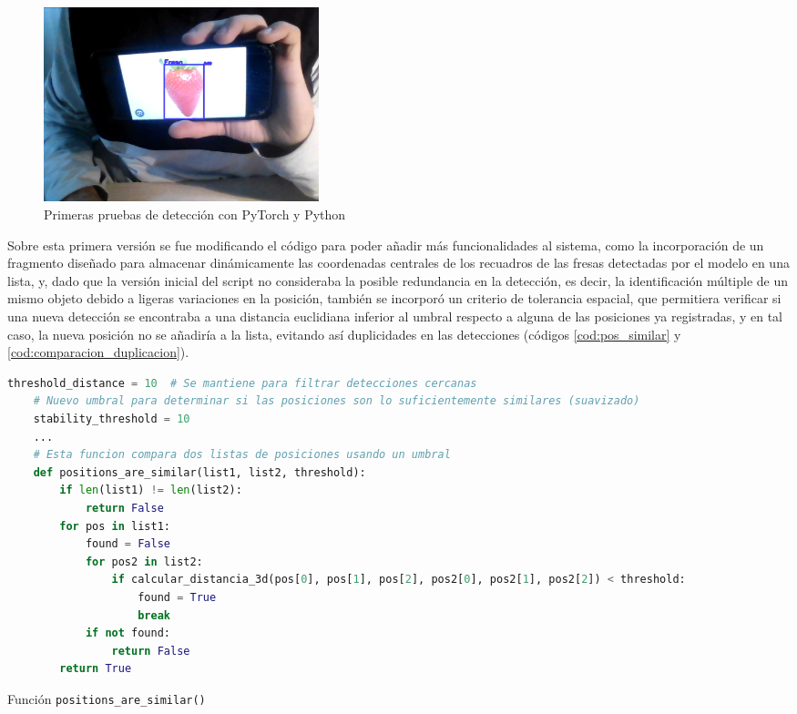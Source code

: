   \begin{figure}[H]
     \centering
     \begin{center}
       \includegraphics[width=80mm]{figs/deteccion_video fresa en foto.png}
     \end{center}
     \caption{Primeras pruebas de detección con PyTorch y Python}
    \label{fig:primerasdetecciones_Python}
  \end{figure}
  
\pagebreak
Sobre esta primera versión se fue modificando el código para poder añadir más funcionalidades al sistema, como la incorporación de un fragmento diseñado para almacenar dinámicamente las coordenadas centrales de los recuadros de las fresas detectadas por el modelo en una lista, y, dado que la versión inicial del script no consideraba la posible redundancia en la detección, es decir, la identificación múltiple de un mismo objeto debido a ligeras variaciones en la posición, también se incorporó un criterio de tolerancia espacial, que permitiera verificar si una nueva detección se encontraba a una distancia euclidiana inferior al umbral respecto a alguna de las posiciones ya registradas, y en tal caso, la nueva posición no se añadiría a la lista, evitando así duplicidades en las detecciones (códigos \ref{cod:pos_similar} y \ref{cod:comparacion_duplicacion}).

\begin{code}[H]
   \begin{lstlisting}[language=Python] 
    threshold_distance = 10  # Se mantiene para filtrar detecciones cercanas
    # Nuevo umbral para determinar si las posiciones son lo suficientemente similares (suavizado)
    stability_threshold = 10
    ...
    # Esta funcion compara dos listas de posiciones usando un umbral
    def positions_are_similar(list1, list2, threshold):
        if len(list1) != len(list2):
            return False
        for pos in list1:
            found = False
            for pos2 in list2:
                if calcular_distancia_3d(pos[0], pos[1], pos[2], pos2[0], pos2[1], pos2[2]) < threshold:
                    found = True
                    break
            if not found:
                return False
        return True
    \end{lstlisting}
    \caption{Función \texttt{positions\_are\_similar()}}
    \label{cod:pos_similar}
\end{code} 

